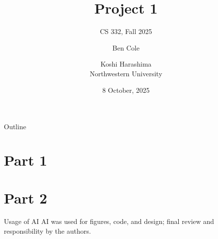 \documentclass{beamer}
\title[Project 1]{Project 1}
\subtitle{CS 332, Fall 2025}
\author{Ben Cole \and Koshi Harashima\\ Northwestern University}
\date{8 October, 2025}
\begin{document}
\maketitle

\begin{frame}{Outline}
  \tableofcontents
\end{frame}


\section{Part 1}
\section{Part 2}

\begin{frame}{Usage of AI}
    AI was used for figures, code, and design; final review and responsibility by the authors.
\end{frame}
\end{document}
